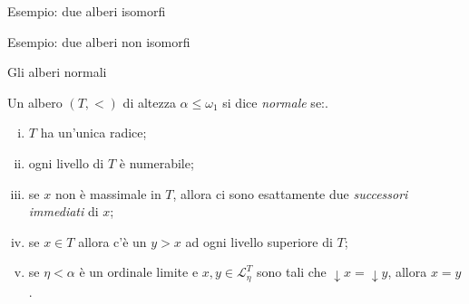 \documentclass{beamer}
\theoremstyle{num.custom-title}
\theoremstyle{custom-title}
\DeclareMathOperator{\down}{\downarrow}
\renewcommand{\L}{\mathcal{L}}
\begin{document}
\begin{frame}{Esempio: due alberi isomorfi}
\end{frame}


\begin{frame}{Esempio: due alberi non isomorfi}



\end{frame}


\begin{frame}{Gli alberi normali}

\begin{definition}
Un albero $(T,<)$ di altezza $\alpha \leq \omega_1$ si dice \emph{normale} se:.
\begin{enumerate}[(i)]
\item $T$ ha un'unica radice;
\item ogni livello di $T$ è numerabile;
\item se $x$ non è massimale in $T$, allora ci sono esattamente due \emph{successori immediati} di $x$;
\item se $x \in T$ allora c'è un $y>x$ ad ogni livello superiore di $T$;
\item se $\eta < \alpha$ è un ordinale limite e $x,y \in \L_\eta^T$ sono tali che $\down x = \down y$, allora $x=y$.
\end{enumerate}
\end{definition}

\end{frame}
\end{document}
